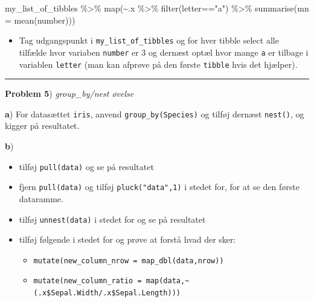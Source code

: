 \documentclass[
]{book}
\newenvironment{Shaded}{\begin{snugshade}}{\end{snugshade}}
\newcommand{\AttributeTok}[1]{\textcolor[rgb]{0.77,0.63,0.00}{#1}}
\newcommand{\FunctionTok}[1]{\textcolor[rgb]{0.00,0.00,0.00}{#1}}
\newcommand{\NormalTok}[1]{#1}
\newcommand{\SpecialCharTok}[1]{\textcolor[rgb]{0.00,0.00,0.00}{#1}}
\newcommand{\StringTok}[1]{\textcolor[rgb]{0.31,0.60,0.02}{#1}}
\providecommand{\tightlist}{%
  \setlength{\itemsep}{0pt}\setlength{\parskip}{0pt}}
\begin{document}
\begin{Shaded}
\begin{Highlighting}[]
\NormalTok{my\_list\_of\_tibbles }\SpecialCharTok{\%\textgreater{}\%} \FunctionTok{map}\NormalTok{(}\SpecialCharTok{\textasciitilde{}}\NormalTok{.x }\SpecialCharTok{\%\textgreater{}\%} \FunctionTok{filter}\NormalTok{(letter}\SpecialCharTok{==}\StringTok{"a"}\NormalTok{) }\SpecialCharTok{\%\textgreater{}\%} \FunctionTok{summarise}\NormalTok{(}\AttributeTok{mn =} \FunctionTok{mean}\NormalTok{(number)))}
\end{Highlighting}
\end{Shaded}

\begin{itemize}
\tightlist
\item
  Tag udgangspunkt i \texttt{my\_list\_of\_tibbles} og for hver tibble select alle tilfælde hvor variaben \texttt{number} er 3 og dernæst optæl hvor mange \texttt{a} er tilbage i variablen \texttt{letter} (man kan afprøve på den første \texttt{tibble} hvis det hjælper).
\end{itemize}

\begin{center}\rule{0.5\linewidth}{0.5pt}\end{center}

\textbf{Problem 5}) \emph{group\_by/nest øvelse}

\textbf{a}) For datasættet \texttt{iris}, anvend \texttt{group\_by(Species)} og tilføj dernæst \texttt{nest()}, og kigger på resultatet.

\textbf{b})

\begin{itemize}
\tightlist
\item
  tilføj \texttt{pull(data)} og se på resultatet
\item
  fjern \texttt{pull(data)} og tilføj \texttt{pluck("data",1)} i stedet for, for at se den første dataramme.
\item
  tilføj \texttt{unnest(data)} i stedet for og se på resultatet
\item
  tilføj følgende i stedet for og prøve at forstå hvad der sker:

  \begin{itemize}
  \tightlist
  \item
    \texttt{mutate(new\_column\_nrow\ =\ map\_dbl(data,nrow))}
  \item
    \texttt{mutate(new\_column\_ratio\ =\ map(data,\textasciitilde{}(.x\$Sepal.Width/.x\$Sepal.Length)))}
  \end{itemize}
\end{itemize}
\end{document}
